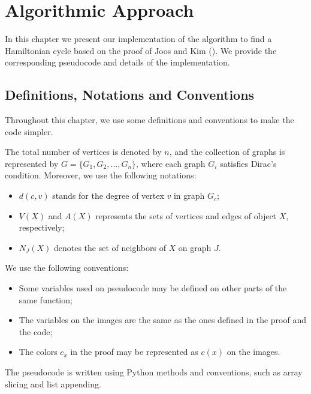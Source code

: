 
\chapter{Algorithmic Approach}
\label{chap:algorithmic}

In this chapter we present our implementation of the algorithm to find a Hamiltonian cycle
based on the proof of Joos and Kim (\cite{Joos_2020}). We provide the corresponding pseudocode 
and details of the implementation.

\section{Definitions, Notations and Conventions}


Throughout this chapter, we use some definitions and conventions to make the code simpler.

The total number of vertices is denoted by $n$, and the collection of 
graphs is represented by $G = \{G_1, G_2, \dots, G_n\}$, where each graph $G_i$ 
satisfies Dirac's condition. Moreover, we use the following notations:

\begin{itemize}
    \item $d(c, v)$ stands for the degree of vertex $v$ in graph $G_c$;
    \item $V(X)$ and $A(X)$ represents the sets of vertices and edges of object $X$, respectively;
    \item $N_J(X)$ denotes the set of neighbors of $X$ on graph $J$.
\end{itemize}

We use the following conventions:

\begin{itemize}
    \item Some variables used on pseudocode may be defined on other parts of the same function;
    \item The variables on the images are the same as the ones defined in the proof and the code;
    \item The colors $c_x$ in the proof may be represented as $c(x)$ on the images.
\end{itemize}

The pseudocode is written using Python methods and conventions, such as array slicing and 
list appending.

